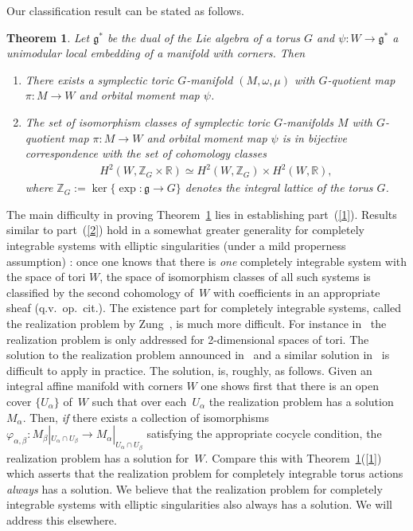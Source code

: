 \documentclass[pdftex]{sigma}
\numberwithin{equation}{section}
\newtheorem{Theorem}[Lemma]{Theorem}
\begin{document}
Our classif\/ication result can be stated as follows.
\begin{Theorem} \label{thm:main}
Let ${\mathfrak g}^*$ be the dual
  of the Lie algebra of a torus $G$ and $\psi\colon W\to {\mathfrak g}^*$ a unimodular
  local embedding of a manifold with corners.  Then
\begin{enumerate}[$1.$]\itemsep=0pt
\item\label{1}
  There exists a symplectic toric $G$-manifold $(M,\omega, \mu)$
  with $G$-quotient map $\pi\colon M \to W$
  and orbital moment map $\psi$.
\item \label{2} The set of isomorphism classes
  of symplectic toric $G$-manifolds $M$
  with $G$-quotient map $\pi\colon M \to W$
  and orbital moment map $\psi$ is in bijective
  correspondence with the set of cohomology classes
\begin{gather*}
H^2 (W, {\mathbb Z}_G\times {\mathbb R}) \simeq H^2 (W, {\mathbb Z}_G)\times H^2 (W, {\mathbb R}),
\end{gather*}
where ${\mathbb Z}_G:=\ker \{\exp\colon {\mathfrak g}\to G\}$ denotes the integral lattice of
the torus $G$.
\end{enumerate}
\end{Theorem}

The main dif\/f\/iculty in proving Theorem~\ref{thm:main} lies in establishing
part~(\ref{1}).
Results similar to part~(\ref{2}) hold in a somewhat greater generality
for completely integrable systems with elliptic singularities
(under a mild properness assumption) \cite{BM, Y, Z}:
once one knows that
there is {\it one} completely integrable system with the space of
tori $W$, the space of isomorphism classes of all such systems
is classif\/ied by the
second cohomology of~$W$ with coef\/f\/icients in an appropriate sheaf
(q.v.\ op.\ cit.).  The existence part for completely integrable
systems, called the realization problem by Zung~\cite{Z}, is much more
dif\/f\/icult.  For instance in~\cite{Z} the realization problem is only
addressed for 2-dimensional spaces of tori.  The solution to the
realization problem announced in~\cite{BM} and a similar solution in~\cite{Y} is dif\/f\/icult to apply in practice.
The solution, is, roughly, as follows.  Given an integral af\/f\/ine
manifold with corners $W$ one shows f\/irst that there is an open cover
$\{U_\alpha\}$ of~$W$ such that over each~$U_\alpha$ the realization
problem has a solution~$M_\alpha$.  Then, {\it if} there exists a
collection of isomorphisms $\varphi_{\alpha,\beta}\colon M_\beta|_{U_\alpha
  \cap U_\beta}\to M_\alpha|_{U_\alpha \cap U_\beta}$ satisfying the
appropriate cocycle condition, the realization problem has a solution
for~$W$.  Compare this with Theorem~\ref{thm:main}(\ref{1}) which
asserts that the realization problem for completely integrable torus
actions {\it always} has a solution.  We believe that the realization
problem for completely integrable systems with elliptic singularities
also always has a solution.  We will address this elsewhere.
\end{document}
